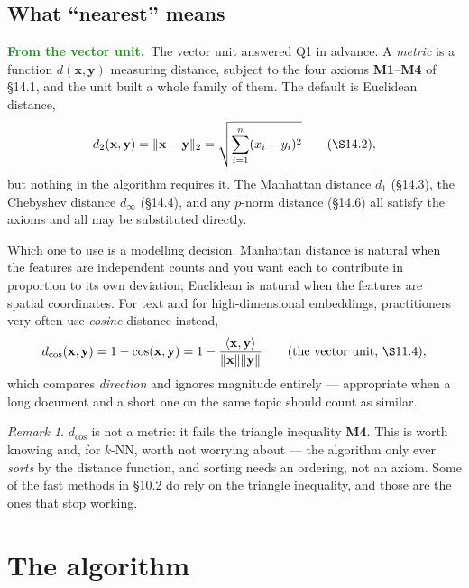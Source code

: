 \documentclass[11pt]{article}
\theoremstyle{plain}
\theoremstyle{definition}
\theoremstyle{remark}
\newtheorem*{rmk}{Remark}
\newcommand{\lookback}{\par\smallskip\noindent
  \textbf{\sffamily\textcolor{ForestGreen}{From the vector unit.}}\ \ignorespaces}
\newcommand{\vc}[1]{\mathbf{#1}}
\newcommand{\norm}[1]{\lVert #1\rVert}
\begin{document}
\subsection{What ``nearest'' means}
\lookback The vector unit answered Q1 in advance. A \emph{metric} is a function
$d(\vc{x},\vc{y})$ measuring distance, subject to the four axioms
\textbf{M1}--\textbf{M4} of \S14.1, and the unit built a whole family of them.
The default is Euclidean distance,
\[
  d_2(\vc{x},\vc{y}) = \norm{\vc{x}-\vc{y}}_2
  = \sqrt{\sum_{i=1}^{n}(x_i-y_i)^{2}} \qquad (\S14.2),
\]
but nothing in the algorithm requires it. The Manhattan distance $d_1$
(\S14.3), the Chebyshev distance $d_\infty$ (\S14.4), and any $p$-norm distance
(\S14.6) all satisfy the axioms and all may be substituted directly.

Which one to use is a modelling decision. Manhattan distance is natural when the
features are independent counts and you want each to contribute in proportion to
its own deviation; Euclidean is natural when the features are spatial
coordinates. For text and for high-dimensional embeddings, practitioners very
often use \emph{cosine} distance instead,
\[
  d_{\cos}(\vc{x},\vc{y}) = 1 - \cos(\vc{x},\vc{y})
  = 1 - \frac{\langle\vc{x},\vc{y}\rangle}{\norm{\vc{x}}\norm{\vc{y}}}
  \qquad (\text{the vector unit, }\S11.4),
\]
which compares \emph{direction} and ignores magnitude entirely --- appropriate
when a long document and a short one on the same topic should count as similar.

\begin{rmk}
$d_{\cos}$ is not a metric: it fails the triangle inequality \textbf{M4}. This
is worth knowing and, for $k$-NN, worth not worrying about --- the algorithm
only ever \emph{sorts} by the distance function, and sorting needs an ordering,
not an axiom. Some of the fast methods in \S10.2 do rely on the triangle
inequality, and those are the ones that stop working.
\end{rmk}

\section{The algorithm}
\end{document}
